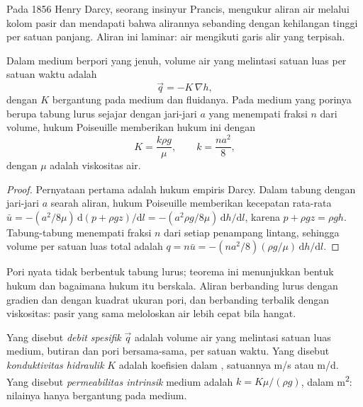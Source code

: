 Pada 1856 Henry Darcy, seorang insinyur Prancis, mengukur aliran air melalui
kolom pasir dan mendapati bahwa alirannya sebanding dengan kehilangan tinggi per satuan
panjang. Aliran ini laminar: air mengikuti garis alir yang terpisah.

\begin{theorem}\label{thm:b3:hydrogeology:darcy}
Dalam medium berpori yang jenuh, volume air yang melintasi satuan luas per
satuan waktu adalah
\[
\vec q = -K\,\nabla h ,
\]
dengan $K$ bergantung pada medium dan fluidanya. Pada medium yang porinya
berupa tabung lurus sejajar dengan jari-jari $a$ yang menempati fraksi $n$ dari
volume, hukum Poiseuille memberikan hukum ini dengan
\[
K = \frac{k\rho g}{\mu}, \qquad k = \frac{na^2}{8} ,
\]
dengan $\mu$ adalah viskositas air.
\end{theorem}

\begin{proof}
Pernyataan pertama adalah hukum empiris Darcy. Dalam tabung dengan jari-jari $a$
searah aliran, hukum Poiseuille memberikan kecepatan rata-rata $\bar u =
-(a^2/8\mu)\,\mathrm d(p + \rho gz)/\mathrm dl = -(a^2\rho g/8\mu)\,\mathrm
dh/\mathrm dl$, karena $p + \rho gz = \rho g h$. Tabung-tabung menempati
fraksi $n$ dari setiap penampang lintang, sehingga volume per satuan luas total adalah
$q = n\bar u = -(na^2/8)(\rho g/\mu)\,\mathrm dh/\mathrm dl$.
\end{proof}

Pori nyata tidak berbentuk tabung lurus; teorema ini menunjukkan bentuk hukum
dan bagaimana hukum itu berskala. Aliran berbanding lurus dengan gradien dan dengan kuadrat
ukuran pori, dan berbanding terbalik dengan viskositas: pasir yang sama
meloloskan air lebih cepat bila hangat.

\begin{definition}\label{def:b3:hydrogeology:darcy}
Yang disebut \emph{debit spesifik} $\vec q$ adalah
volume air yang melintasi satuan luas medium, butiran dan pori
bersama-sama, per satuan waktu. Yang disebut \emph{konduktivitas
hidraulik} $K$ adalah koefisien dalam , satuannya \unit{m/s} atau \unit{m/d}. Yang disebut \emph{permeabilitas
intrinsik} medium adalah $k =
K\mu/(\rho g)$, dalam \unit{m^2}: nilainya hanya bergantung pada medium.
\end{definition}


